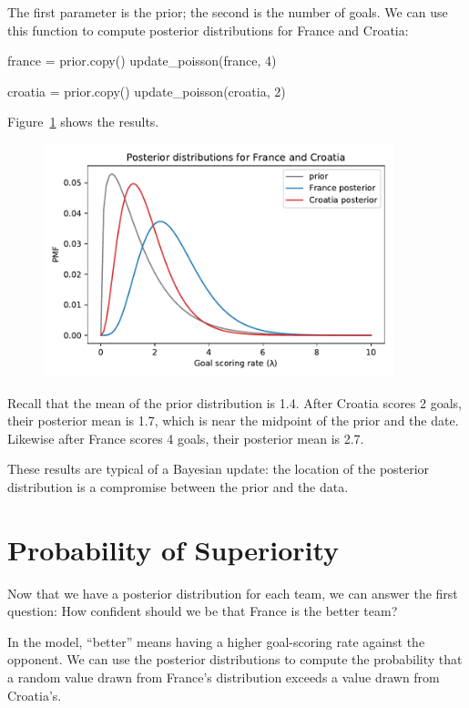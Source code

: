 \documentclass[12pt]{book}
\theoremstyle{exercise}
\begin{document}
The first parameter is the prior; the second is the number of goals.
We can use this function to compute posterior distributions for France and Croatia:

\begin{code}
france = prior.copy()
update_poisson(france, 4)

croatia = prior.copy()
update_poisson(croatia, 2)
\end{code}

Figure~\ref{fig07-03} shows the results.

\begin{figure}
\centerline{\includegraphics[width=4in]{figs/fig07-03.pdf}}
\caption{}
\label{fig07-03}
\end{figure}

Recall that the mean of the prior distribution is 1.4.
After Croatia scores 2 goals, their posterior mean is 1.7, which is near the midpoint of the prior and the date.
Likewise after France scores 4 goals, their posterior mean is 2.7.

These results are typical of a Bayesian update: the location of the posterior distribution is a compromise between the prior and the data.


\section{Probability of Superiority}

Now that we have a posterior distribution for each team, we can answer the first question: How confident should we be that France is the better team?

In the model, ``better'' means having a higher goal-scoring rate against the opponent.  
We can use the posterior distributions to compute the probability that a random value drawn from France's distribution exceeds a value drawn from Croatia's.
\end{document}
